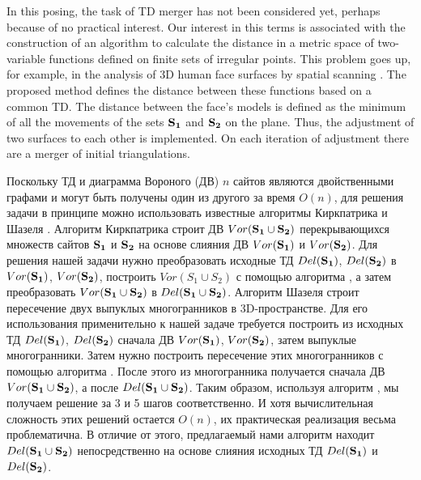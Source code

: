 \documentclass[12pt]{article}
\begin{document}
In this posing, the task of TD merger has not been considered yet, perhaps because of no practical interest.
Our interest in this terms is associated with the construction of an algorithm to calculate the distance in a metric space of 	two-variable functions defined on finite sets of irregular points.
This problem goes up, for example, in the analysis of 3D human face surfaces by spatial scanning \cite{Dyshkant}.
The proposed method defines the distance between these functions based on a common TD.
The distance between the face's models is defined as the minimum of all the movements of the sets $\bf{S_1}$ and $\bf{S_2}$ on the plane.
Thus, the adjustment of two surfaces to each other is implemented.
On each iteration of adjustment there are a merger of initial triangulations.

{\color{green}
Поскольку ТД и диаграмма Вороного (ДВ) $n$ сайтов являются двойственными графами и могут быть получены один из другого за время $O(n)$, для решения задачи в принципе можно использовать известные алгоритмы Киркпатрика \cite{Kirkpatrick} и Шазеля \cite{Chazelle}.
Алгоритм Киркпатрика \cite{Kirkpatrick} строит ДВ $Vor(\bf{S_1} \cup \bf{S_2})$ перекрывающихся множеств сайтов $\bf{S_1}$ и $\bf{S_2}$ на основе слияния ДВ $Vor(\bf{S_1})$ и $Vor(\bf{S_2})$. Для решения нашей задачи нужно преобразовать исходные ТД $Del(\bf{S_1})$, $Del(\bf{S_2})$ в $Vor(\bf{S_1})$, $Vor(\bf{S_2})$, построить $Vor(S_1 \cup S_2)$ с помощью алгоритма \cite{Kirkpatrick}, а затем преобразовать $Vor(\bf{S_1} \cup \bf{S_2})$ в $Del(\bf{S_1} \cup \bf{S_2})$.
Алгоритм Шазеля \cite{Chazelle} строит пересечение двух выпуклых многогранников в 3D-пространстве.
Для его использования применительно к нашей задаче требуется построить из исходных ТД $Del(\bf{S_1})$, $Del(\bf{S_2})$ сначала ДВ $Vor(\bf{S_1})$, $Vor(\bf{S_2})$, затем выпуклые многогранники. Затем нужно построить пересечение этих многогранников с помощью алгоритма \cite{Chazelle}. После этого из многогранника получается сначала ДВ $Vor(\bf{S_1} \cup \bf{S_2})$, а после $Del(\bf{S_1} \cup \bf{S_2})$.
Таким образом, используя алгоритм \cite{Kirkpatrick, Chazelle}, мы получаем решение за 3 и 5 шагов соответственно. И хотя вычислительная сложность этих решений остается $O(n)$, их практическая реализация весьма проблематична.
В отличие от этого, предлагаемый нами алгоритм находит $Del(\bf{S_1} \cup \bf{S_2})$ непосредственно на основе слияния исходных ТД $Del(\bf{S_1})$ и $Del(\bf{S_2})$.
}
\end{document}
